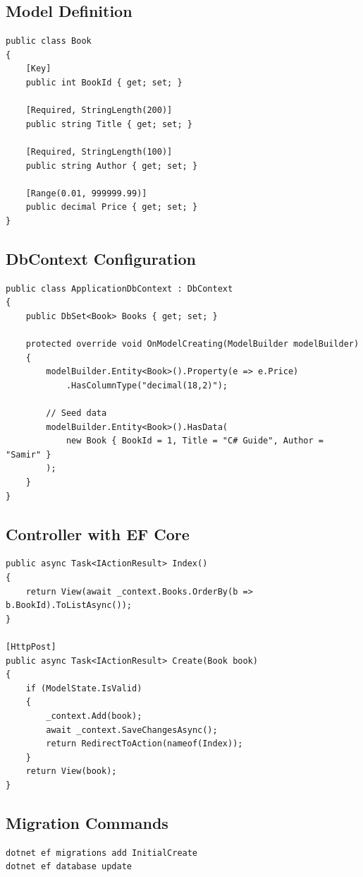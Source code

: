 \documentclass[10pt,a4paper]{article}
\begin{document}
\subsection*{Model Definition}
\begin{lstlisting}[basicstyle=\ttfamily\tiny]
public class Book
{
    [Key]
    public int BookId { get; set; }
    
    [Required, StringLength(200)]
    public string Title { get; set; }
    
    [Required, StringLength(100)]
    public string Author { get; set; }
    
    [Range(0.01, 999999.99)]
    public decimal Price { get; set; }
}
\end{lstlisting}

\subsection*{DbContext Configuration}
\begin{lstlisting}[basicstyle=\ttfamily\tiny]
public class ApplicationDbContext : DbContext
{
    public DbSet<Book> Books { get; set; }
    
    protected override void OnModelCreating(ModelBuilder modelBuilder)
    {
        modelBuilder.Entity<Book>().Property(e => e.Price)
            .HasColumnType("decimal(18,2)");
        
        // Seed data
        modelBuilder.Entity<Book>().HasData(
            new Book { BookId = 1, Title = "C# Guide", Author = "Samir" }
        );
    }
}
\end{lstlisting}

\subsection*{Controller with EF Core}
\begin{lstlisting}[basicstyle=\ttfamily\tiny]
public async Task<IActionResult> Index()
{
    return View(await _context.Books.OrderBy(b => b.BookId).ToListAsync());
}

[HttpPost]
public async Task<IActionResult> Create(Book book)
{
    if (ModelState.IsValid)
    {
        _context.Add(book);
        await _context.SaveChangesAsync();
        return RedirectToAction(nameof(Index));
    }
    return View(book);
}
\end{lstlisting}

\subsection*{Migration Commands}
\begin{verbatim}
dotnet ef migrations add InitialCreate
dotnet ef database update
\end{verbatim}
\end{document}
